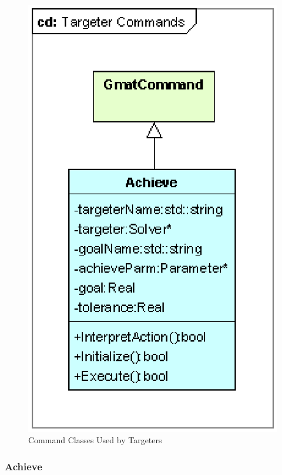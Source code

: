 \begin{figure}[htb]
\begin{center}
\includegraphics[scale=0.5]{Images/TargeterCommands.eps}
\caption{\label{figure:TargeterCommands}Command Classes Used by Targeters}
\end{center}
\end{figure}

\subsubsection{Achieve}

